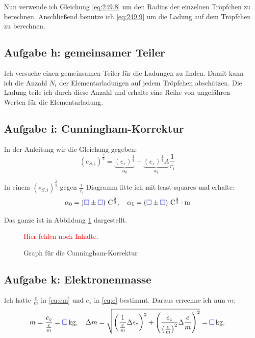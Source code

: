 \documentclass[11pt]{article}
\newcommand{\emesswert}{\left(\messwert \pm \messwert \right)}
\newcommand{\fehlt}{\textcolor{red}{Hier fehlen noch Inhalte.}}
\newcommand{\messwert}{\textcolor{blue}{\square}}
\begin{document}
Nun verwende ich Gleichung \eqref{eq:249.8} um den Radius der einzelnen
Tröpfchen zu berechnen. Anschließend benutze ich \eqref{eq:249.9} um die Ladung
auf dem Tröpfchen zu berechnen.

\subsection{Aufgabe h: gemeinsamer Teiler}

Ich versuche einen gemeinsamen Teiler für die Ladungen zu finden. Damit kann
ich die Anzahl $N_i$ der Elementarladungen auf jedem Tröpfchen abschätzen. Die
Ladung teile ich durch diese Anzahl und erhalte eine Reihe von ungefähren
Werten für die Elementarladung.

\subsection{Aufgabe i: Cunningham-Korrektur}

In der Anleitung wir die Gleichung gegeben:
\[
	\left( e_{S, i} \right)^{\frac 23}
	= \underbrace{\left( e_\circ \right)^{\frac 23}}_{\alpha_0}
	+ \underbrace{\left( e_\circ \right)^{\frac 23} A}_{\alpha_1} \frac 1{r_i}
\]

In einem $\left( e_{S, i} \right)^{\frac 23}$ gegen $\frac 1{r_i}$ Diagramm
fitte ich mit least-squares und erhalte:
\[
	\alpha_0 = \unit[\emesswert]{C^{\frac 23}}
	, \quad
	\alpha_1 = \unit[\emesswert]{C^{\frac 23} \cdot m}
\]

Das ganze ist in Abbildung \ref{fig:cunningham} dargestellt.

\begin{figure}[h!]
	\centering
	\fehlt
	\caption{Graph für die Cunningham-Korrektur}
	\label{fig:cunningham}
\end{figure}

\subsection{Aufgabe k: Elektronenmasse}

Ich hatte $\frac em$ in \eqref{eq:em} und $e_\circ$ in \eqref{eq:e} bestimmt.
Daraus errechne ich nun $m$:
\[
	m = \frac{e_\circ}{\frac em} = \unit[\messwert]{kg},
	\quad
	\Delta m = \sqrt{
		\left(\frac{1}{\frac em} \Delta e_\circ \right)^2
		+ \left( \frac{e_\circ}{\left( \frac em \right)^2} \Delta \frac em \right)^2
	}
	= \unit[\messwert]{kg},
\]

\end{document}
